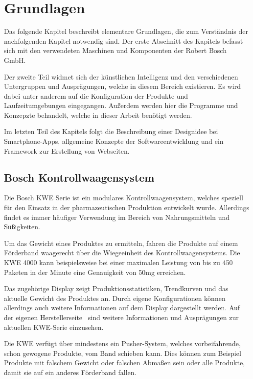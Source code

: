 \chapter{Grundlagen}
\label{ch:grundlagen}
Das folgende Kapitel beschreibt elementare Grundlagen, die zum Verständnis der nachfolgenden Kapitel notwendig sind. Der
erste Abschnitt des Kapitels befasst sich mit den verwendeten Maschinen und Komponenten der Robert Bosch GmbH.

Der zweite Teil widmet sich der künstlichen Intelligenz und den verschiedenen Untergruppen und Ausprägungen, welche in
diesem Bereich existieren. Es wird dabei unter anderem auf die Konfiguration der Produkte und Laufzeitumgebungen
eingegangen. Außerdem werden hier die Programme und Konzepzte behandelt, welche in dieser Arbeit benötigt werden.

Im letzten Teil des Kapitels folgt die Beschreibung einer Designidee bei Smartphone-Apps, allgemeine Konzepte der
Softwareentwicklung und ein Framework zur Erstellung von Webseiten.

\section{Bosch Kontrollwaagensystem}
Die Bosch KWE Serie ist ein modulares Kontrollwaagensystem, welches speziell für den Einsatz in der pharmazeutischen
Produktion entwickelt wurde. Allerdings findet es immer häufiger Verwendung im Bereich von Nahrungsmitteln und
Süßigkeiten.

Um das Gewicht eines Produktes zu ermitteln, fahren die Produkte auf einem Förderband waagerecht über die Wiegeeinheit
des Kontrollwaagensystems. Die KWE 4000 kann beispielsweise bei einer maximalen Leistung von bis zu 450 Paketen in der
Minute eine Genauigkeit von 50mg erreichen.

Das zugehörige Display zeigt Produktionsstatistiken, Trendkurven und das aktuelle Gewicht des Produktes an. Durch eigene
Konfigurationen können allerdings auch weitere Informationen auf dem Display dargestellt werden. Auf der eigenen
Herstellerseite~\cite{online_grundlagen_boschkwe} sind weitere Informationen und Ausprägungen zur aktuellen KWE-Serie
einzusehen.

Die KWE verfügt über mindestens ein Pusher-System, welches vorbeifahrende, schon gewogene Produkte, vom Band schieben
kann. Dies können zum Beispiel Produkte mit falschem Gewicht oder falschen Abmaßen sein oder alle Produkte, damit sie
auf ein anderes Förderband fallen.

